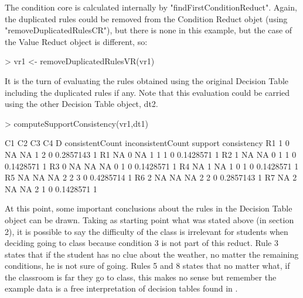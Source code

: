\documentclass[a4paper]{article}
\begin{document}
The condition core is calculated internally by "findFirstConditionReduct". Again, the duplicated rules could be removed from the Condition Reduct objet (using "removeDuplicatedRulesCR"), but there is none in this example, but the case of the Value Reduct object is different, so:

\begin{Schunk}
\begin{Sinput}
> vr1 <- removeDuplicatedRulesVR(vr1)
\end{Sinput}
\end{Schunk}

It is the turn of evaluating the rules obtained using the original Decision Table including the duplicated rules if any. Note that this evaluation could be carried using the other Decision Table object, dt2.

\begin{Schunk}
\begin{Sinput}
> computeSupportConsistency(vr1,dt1)
\end{Sinput}
\begin{Soutput}
   C1 C2 C3 C4 D consistentCount inconsistentCount   support consistency
R1  1  0 NA NA 1               2                 0 0.2857143           1
R1 NA  0 NA  1 1               1                 0 0.1428571           1
R2  1 NA NA  0 1               1                 0 0.1428571           1
R3  0 NA NA NA 0               1                 0 0.1428571           1
R4 NA  1 NA  1 0               1                 0 0.1428571           1
R5 NA NA NA  2 2               3                 0 0.4285714           1
R6  2 NA NA NA 2               2                 0 0.2857143           1
R7 NA  2 NA NA 2               1                 0 0.1428571           1
\end{Soutput}
\end{Schunk}

At this point, some important conclusions about the rules in the Decision Table object can be drawn. Taking as starting point what was stated above (in section 2), it is possible to say the difficulty of the class is irrelevant for students when deciding going to class because condition 3 is not part of this reduct. Rule 3 states that if the student has no clue about the weather, no matter the remaining conditions, he is not sure of going. Rules 5 and 8 states that no matter what, if the classroom is far they go to class, this makes no sense but remember the example data is a free interpretation of decision tables found in \cite{pawlak}.
\end{document}
